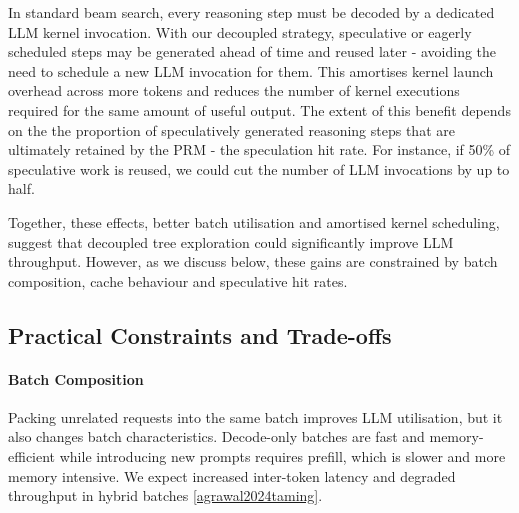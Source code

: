 \documentclass[11pt,twoside]{report}
\begin{document}
In standard beam search, every reasoning step must be decoded by a dedicated LLM kernel invocation. 
With our decoupled strategy, speculative or eagerly scheduled steps may be generated ahead of time and reused later - avoiding the need to schedule a new LLM invocation for them. 
This amortises kernel launch overhead across more tokens and reduces the number of kernel executions required for the same amount of useful output. 
The extent of this benefit depends on the the proportion of speculatively generated reasoning steps that are ultimately retained by the PRM - the speculation hit rate. 
For instance, if 50\% of speculative work is reused, we could cut the number of LLM invocations by up to half.

\vspace{0.5em}
Together, these effects, better batch utilisation and amortised kernel scheduling, suggest that decoupled tree exploration could significantly improve LLM throughput. 
However, as we discuss below, these gains are constrained by batch composition, cache behaviour and speculative hit rates.

\subsection{Practical Constraints and Trade-offs}

\paragraph{Batch Composition}

Packing unrelated requests into the same batch improves LLM utilisation, but it also changes batch characteristics. 
Decode-only batches are fast and memory-efficient while introducing new prompts requires prefill, which is slower and more memory intensive. 
We expect increased inter-token latency and degraded throughput in hybrid batches \ref{agrawal2024taming}. 

\end{document}
